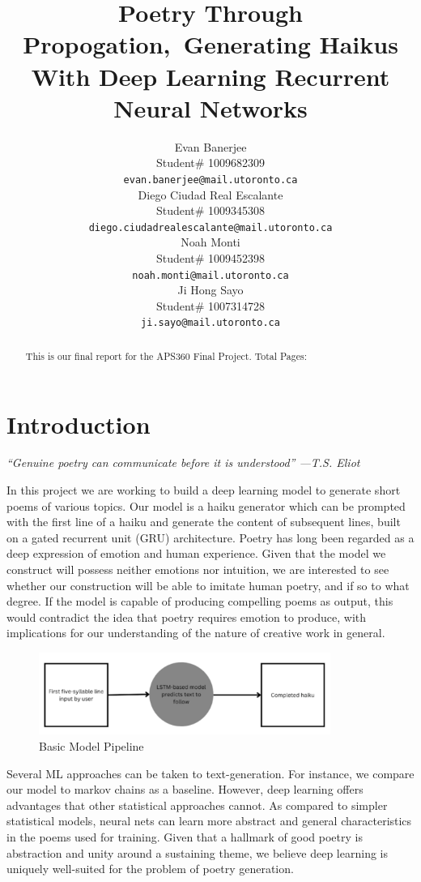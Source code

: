 \documentclass{article} %
\title{Poetry Through Propogation,\ Generating Haikus With Deep Learning Recurrent Neural Networks}
\author{Evan Banerjee  \\
Student\# 1009682309\\
\texttt{evan.banerjee@mail.utoronto.ca} \\
\And
Diego Ciudad Real Escalante  \\
Student\# 1009345308 \\
\texttt{diego.ciudadrealescalante@mail.utoronto.ca} \\
\AND
Noah Monti  \\
Student\# 1009452398 \\
\texttt{noah.monti@mail.utoronto.ca} \\
\And
Ji Hong Sayo \\
Student\# 1007314728 \\
\texttt{ji.sayo@mail.utoronto.ca} \\
\AND
}
\begin{document}
\maketitle

\begin{abstract}
  This is our final report for the APS360 Final Project.
  Total Pages: \pageref{last_page}
\end{abstract}

\section{Introduction}

\begin{center}
  \textit{“Genuine poetry can communicate before it is understood” —T.S. Eliot}
\end{center}

In this project we are working to build a deep learning model to generate short poems of various topics.
Our model is a haiku generator which can be prompted with the first line of a haiku and generate the content of subsequent lines, built on a gated recurrent unit (GRU) architecture.
Poetry has long been regarded as a deep expression of emotion and human experience. Given that the model we construct will possess neither emotions nor intuition, we are interested to see whether our construction will be able to imitate human poetry, and if so to what degree. If the model is capable of producing compelling poems as output, this would contradict the idea that poetry requires emotion to produce, with implications for our understanding of the nature of creative work in general.

\begin{figure}[h]
  \begin{center}
  \includegraphics[width=0.85\textwidth]{Figs/pipeline.png}
  \end{center}
  \caption{Basic Model Pipeline}
  \label{fig:Basic Model Pipeline}
\end{figure}

Several ML approaches can be taken to text-generation. For instance, we compare our model to markov chains as a baseline. However, deep learning offers advantages that other statistical approaches cannot. As compared to simpler statistical models, neural nets can learn more abstract and general characteristics in the poems used for training. Given that a hallmark of good poetry is abstraction and unity around a sustaining theme, we believe deep learning is uniquely well-suited for the problem of poetry generation. 
\end{document}
